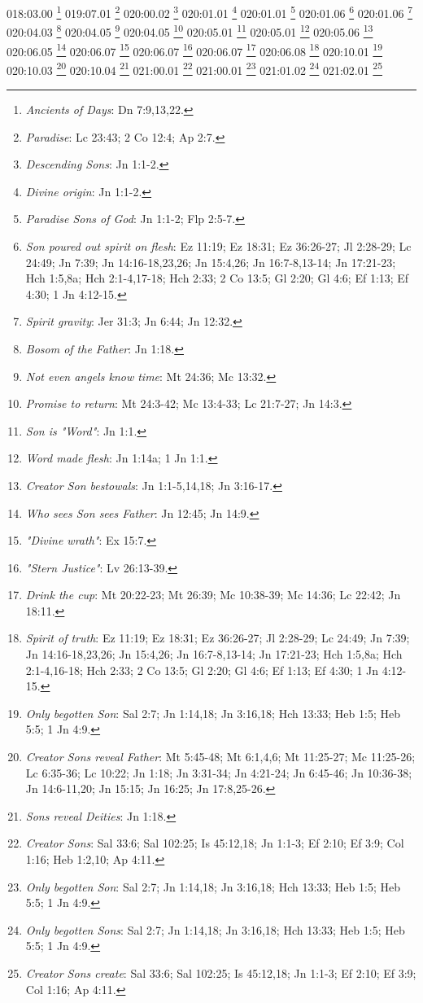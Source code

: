 {018:03.00 \footnote{\textit{Ancients of Days}: Dn 7:9,13,22.}
019:07.01 \footnote{\textit{Paradise}: Lc 23:43; 2 Co 12:4; Ap 2:7.}
020:00.02 \footnote{\textit{Descending Sons}: Jn 1:1-2.}
020:01.01 \footnote{\textit{Divine origin}: Jn 1:1-2.}
020:01.01 \footnote{\textit{Paradise Sons of God}: Jn 1:1-2; Flp 2:5-7.}
020:01.06 \footnote{\textit{Son poured out spirit on flesh}: Ez 11:19; Ez 18:31; Ez 36:26-27; Jl 2:28-29; Lc 24:49; Jn 7:39; Jn 14:16-18,23,26; Jn 15:4,26; Jn 16:7-8,13-14; Jn 17:21-23; Hch 1:5,8a; Hch 2:1-4,17-18; Hch 2:33; 2 Co 13:5; Gl 2:20; Gl 4:6; Ef 1:13; Ef 4:30; 1 Jn 4:12-15.}
020:01.06 \footnote{\textit{Spirit gravity}: Jer 31:3; Jn 6:44; Jn 12:32.}
020:04.03 \footnote{\textit{Bosom of the Father}: Jn 1:18.}
020:04.05 \footnote{\textit{Not even angels know time}: Mt 24:36; Mc 13:32.}
020:04.05 \footnote{\textit{Promise to return}: Mt 24:3-42; Mc 13:4-33; Lc 21:7-27; Jn 14:3.}
020:05.01 \footnote{\textit{Son is "Word"}: Jn 1:1.}
020:05.01 \footnote{\textit{Word made flesh}: Jn 1:14a; 1 Jn 1:1.}
020:05.06 \footnote{\textit{Creator Son bestowals}: Jn 1:1-5,14,18; Jn 3:16-17.}
020:06.05 \footnote{\textit{Who sees Son sees Father}: Jn 12:45; Jn 14:9.}
020:06.07 \footnote{\textit{"Divine wrath"}: Ex 15:7.}
020:06.07 \footnote{\textit{"Stern Justice"}: Lv 26:13-39.}
020:06.07 \footnote{\textit{Drink the cup}: Mt 20:22-23; Mt 26:39; Mc 10:38-39; Mc 14:36; Lc 22:42; Jn 18:11.}
020:06.08 \footnote{\textit{Spirit of truth}: Ez 11:19; Ez 18:31; Ez 36:26-27; Jl 2:28-29; Lc 24:49; Jn 7:39; Jn 14:16-18,23,26; Jn 15:4,26; Jn 16:7-8,13-14; Jn 17:21-23; Hch 1:5,8a; Hch 2:1-4,16-18; Hch 2:33; 2 Co 13:5; Gl 2:20; Gl 4:6; Ef 1:13; Ef 4:30; 1 Jn 4:12-15.}
020:10.01 \footnote{\textit{Only begotten Son}: Sal 2:7; Jn 1:14,18; Jn 3:16,18; Hch 13:33; Heb 1:5; Heb 5:5; 1 Jn 4:9.}
020:10.03 \footnote{\textit{Creator Sons reveal Father}: Mt 5:45-48; Mt 6:1,4,6; Mt 11:25-27; Mc 11:25-26; Lc 6:35-36; Lc 10:22; Jn 1:18; Jn 3:31-34; Jn 4:21-24; Jn 6:45-46; Jn 10:36-38; Jn 14:6-11,20; Jn 15:15; Jn 16:25; Jn 17:8,25-26.}
020:10.04 \footnote{\textit{Sons reveal Deities}: Jn 1:18.}
021:00.01 \footnote{\textit{Creator Sons}: Sal 33:6; Sal 102:25; Is 45:12,18; Jn 1:1-3; Ef 2:10; Ef 3:9; Col 1:16; Heb 1:2,10; Ap 4:11.}
021:00.01 \footnote{\textit{Only begotten Son}: Sal 2:7; Jn 1:14,18; Jn 3:16,18; Hch 13:33; Heb 1:5; Heb 5:5; 1 Jn 4:9.}
021:01.02 \footnote{\textit{Only begotten Sons}: Sal 2:7; Jn 1:14,18; Jn 3:16,18; Hch 13:33; Heb 1:5; Heb 5:5; 1 Jn 4:9.}
021:02.01 \footnote{\textit{Creator Sons create}: Sal 33:6; Sal 102:25; Is 45:12,18; Jn 1:1-3; Ef 2:10; Ef 3:9; Col 1:16; Ap 4:11.}
}
